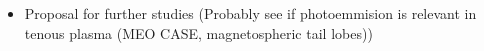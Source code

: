 \begin{itemize}
	\item Proposal for further studies (Probably see if photoemmision is relevant in tenous plasma (MEO CASE, magnetospheric tail lobes))
\end{itemize}
